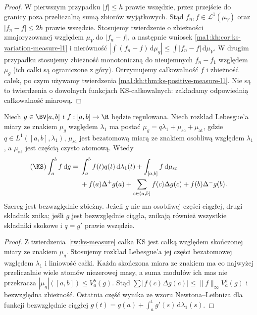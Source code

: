 \begin{proof}
W pierwszym przypadku $|f|\le h$ prawie wszędzie, przez przejście do granicy poza przeliczalną sumą zbiorów wyjątkowych. Stąd $f_n,f\in\mathcal L^1(\mu_V)$ oraz $|f_n-f|\le2h$ prawie wszędzie. Stosujemy twierdzenie o zbieżności zmajoryzowanej względem $\mu_V$ do $|f_n-f|$, a następnie wniosek \ref{ma1:kh:cor:ks-variation-measure-l1} i nierówność
$|\int(f_n-f)\,\mathrm d\mu_g|\le\int |f_n-f|\,\mathrm d\mu_V$.
W drugim przypadku stosujemy zbieżność monotoniczną do nieujemnych $f_n-f_1$ względem $\mu_g$ (ich całki są ograniczone z góry). Otrzymujemy całkowalność $f$ i zbieżność całek, po czym używamy twierdzenia \ref{ma1:kh:thm:ks-positive-measure-l1}. Nie są to twierdzenia o dowolnych funkcjach KS-całkowalnych: zakładamy odpowiednią całkowalność miarową.
\end{proof}

\begin{twierdzenie}
\label{tw:ks-decomp}
Niech $g\in\BV[a,b]$ i $f:[a,b]\to\R$ będzie regulowana. Niech rozkład Lebesgue'a miary ze znakiem $\mu_g$ względem $\lambda_1$ ma postać
$\mu_g=q\lambda_1+\mu_{\mathrm{sc}}+\mu_{\mathrm{at}}$, gdzie $q\in L^1([a,b],\lambda_1)$, $\mu_{\mathrm{sc}}$ jest bezatomową miarą ze znakiem osobliwą względem $\lambda_1$, a $\mu_{\mathrm{at}}$ jest częścią czysto atomową. Wtedy
\[
 \begin{aligned}
 (\KS)\int_a^b f\,\mathrm dg
 ={}&\int_a^b f(t)q(t)\,\mathrm d\lambda_1(t)
 +\int_{[a,b]}f\,\mathrm d\mu_{\mathrm{sc}}\\
 &+f(a)\Delta^+g(a)+\sum_{c\in(a,b)}f(c)\Delta g(c)
 +f(b)\Delta^-g(b).
 \end{aligned}
\]
Szereg jest bezwzględnie zbieżny. Jeżeli $g$ nie ma osobliwej części ciągłej, drugi składnik znika; jeśli $g$ jest bezwzględnie ciągła, znikają również wszystkie składniki skokowe i $q=g'$ prawie wszędzie.
\end{twierdzenie}
\begin{proof}
Z twierdzenia~\ref{tw:ks-measure} całka KS jest całką względem skończonej miary ze znakiem $\mu_g$. Stosujemy rozkład Lebesgue'a jej części bezatomowej względem $\lambda_1$ i liniowość całki. Każda skończona miara ze znakiem ma co najwyżej przeliczalnie wiele atomów niezerowej masy, a suma modułów ich mas nie przekracza $|\mu_g|([a,b])\le V_a^b(g)$. Stąd $\sum|f(c)\Delta g(c)|\le\|f\|_\infty V_a^b(g)$ i bezwzględna zbieżność. Ostatnia część wynika ze wzoru Newtona--Leibniza dla funkcji bezwzględnie ciągłej $g(t)=g(a)+\int_a^t g'(s)\,\mathrm d\lambda_1(s)$.
\end{proof}

